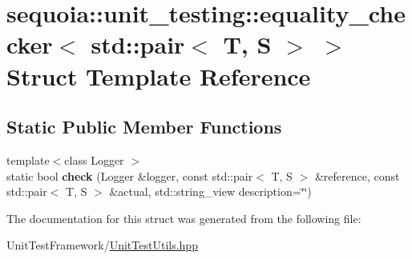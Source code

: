 \hypertarget{structsequoia_1_1unit__testing_1_1equality__checker_3_01std_1_1pair_3_01_t_00_01_s_01_4_01_4}{}\section{sequoia\+::unit\+\_\+testing\+::equality\+\_\+checker$<$ std\+::pair$<$ T, S $>$ $>$ Struct Template Reference}
\label{structsequoia_1_1unit__testing_1_1equality__checker_3_01std_1_1pair_3_01_t_00_01_s_01_4_01_4}
\subsection*{Static Public Member Functions}
\begin{DoxyCompactItemize}
\item 
\mbox{\label{structsequoia_1_1unit__testing_1_1equality__checker_3_01std_1_1pair_3_01_t_00_01_s_01_4_01_4_a085630e20157baf9d731528d45aa38ff}} 
{\footnotesize template$<$class Logger $>$ }\\static bool {\bfseries check} (Logger \&logger, const std\+::pair$<$ T, S $>$ \&reference, const std\+::pair$<$ T, S $>$ \&actual, std\+::string\+\_\+view description=\char`\"{}\char`\"{})
\end{DoxyCompactItemize}


The documentation for this struct was generated from the following file\+:\begin{DoxyCompactItemize}
\item 
Unit\+Test\+Framework/\mbox{\hyperlink{_unit_test_utils_8hpp}{Unit\+Test\+Utils.\+hpp}}\end{DoxyCompactItemize}
